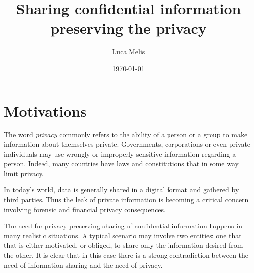\documentclass[dvips,12pt]{article}
\begin{document}
\title{Sharing confidential information preserving the privacy}
\author{Luca Melis}
\date{\today}



\maketitle
\section{Motivations}
The word \emph{privacy} commonly refers to the ability of a person or a group to make information about themselves private. Governments, corporations or even private individuals may use wrongly or improperly sensitive information regarding a person. Indeed, many countries have laws and constitutions that in some way limit privacy.


In today's world, data is generally shared in a digital format and gathered by third parties.
Thus the leak of private information is becoming a critical concern involving forensic and financial  privacy consequences.
   
The need for privacy-preserving sharing of confidential information happens in many realistic situations.
A typical scenario may involve two entities: one that that is either motivated, or obliged, to share only the information desired from the other.
It is clear that in this case there is a strong contradiction between the need of information sharing and the need of privacy.
\end{document}
